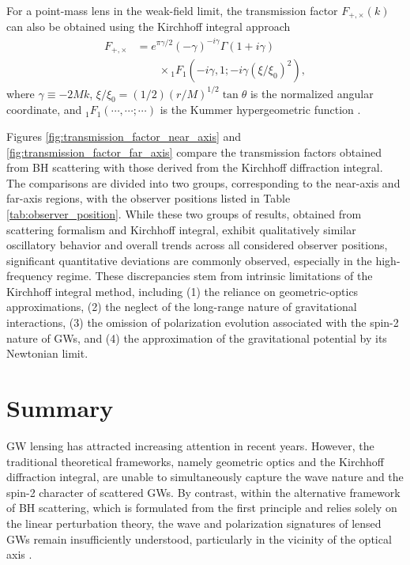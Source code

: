 \documentclass[reprint,amsmath,amssymb,aps,prd]{revtex4-2}
\begin{document}
For a point-mass lens in the weak-field limit, the transmission factor $F_{+,\times}(k)$ can also be obtained using the Kirchhoff integral approach \cite{Takahashi_2003,Meena_2019,Guo_2020} 
\begin{equation}
\label{eq:Kirchhoff}
\begin{aligned}
F_{+,\times}&=e^{\pi\gamma/2}\left(-\gamma\right)^{-i\gamma}\Gamma(1+i\gamma)\\
&\qquad\times{_1F_1}(-i\gamma,1;-i\gamma(\xi/\xi_0)^2),
\end{aligned}
\end{equation}
where $\gamma\equiv-2Mk$, $\xi/\xi_0=(1/2)(r/M)^{1/2}\tan\theta$ is the normalized angular coordinate, and ${_1F_1}(\cdots,\cdots;\cdots)$ is the Kummer hypergeometric function \cite{NIST:DLMF}. 

Figures \ref{fig:transmission_factor_near_axis} and \ref{fig:transmission_factor_far_axis} compare the transmission factors obtained from BH scattering with those derived from the Kirchhoff diffraction integral. The comparisons are divided into two groups, corresponding to the near-axis and far-axis regions, with the observer positions listed in Table \ref{tab:observer_position}. While these two groups of results, obtained from scattering formalism and Kirchhoff integral, exhibit qualitatively similar oscillatory behavior and overall trends across all considered observer positions, significant quantitative deviations are commonly observed, especially in the high-frequency regime. These discrepancies stem from intrinsic limitations of the Kirchhoff integral method, including (1) the reliance on geometric-optics approximations, (2) the neglect of the long-range nature of gravitational interactions, (3) the omission of polarization evolution associated with the spin-2 nature of GWs, and (4) the approximation of the gravitational potential by its Newtonian limit.

\section{\label{sec:summary}Summary}
GW lensing has attracted increasing attention in recent years. However, the traditional theoretical frameworks, namely geometric optics and the Kirchhoff diffraction integral, are unable to simultaneously capture the wave nature and the spin-2 character of scattered GWs. By contrast, within the alternative framework of BH scattering, which is formulated from the first principle and relies solely on the linear perturbation theory, the wave and polarization signatures of lensed GWs remain insufficiently understood, particularly in the vicinity of the optical axis \cite{Pijnenburg_2024b,Chan_2025,Saketh_2025}.
\end{document}
